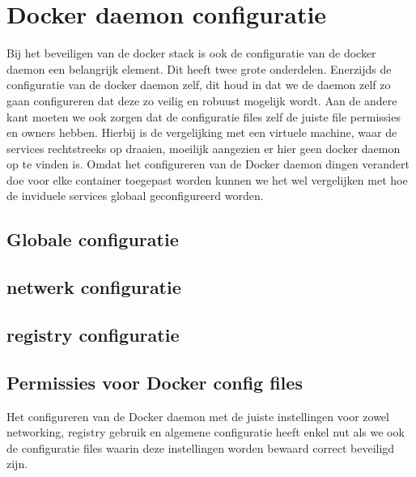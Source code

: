 \section{Docker daemon configuratie}

Bij het beveiligen van de docker stack is ook de configuratie van de docker daemon een belangrijk element. Dit heeft twee grote onderdelen. Enerzijds de configuratie van de docker daemon zelf, dit houd in dat we de daemon zelf zo gaan configureren dat deze zo veilig en robuust mogelijk wordt. Aan de andere kant moeten we ook zorgen dat de configuratie files zelf de juiste file permissies en owners hebben. Hierbij is de vergelijking met een virtuele machine, waar de services rechtstreeks op draaien, moeilijk aangezien er hier geen docker daemon op te vinden is. Omdat het configureren van de Docker daemon dingen verandert doe voor elke container toegepast worden kunnen we het wel vergelijken met hoe de inviduele services globaal geconfigureerd worden.


\subsection{Globale configuratie}



\subsection{netwerk configuratie}




\subsection{registry configuratie}


\subsection{Permissies voor Docker config files}

Het configureren van de Docker daemon met de juiste instellingen voor zowel networking, registry gebruik en algemene configuratie heeft enkel nut als we ook de configuratie files waarin deze instellingen worden bewaard correct beveiligd zijn. 

% 

